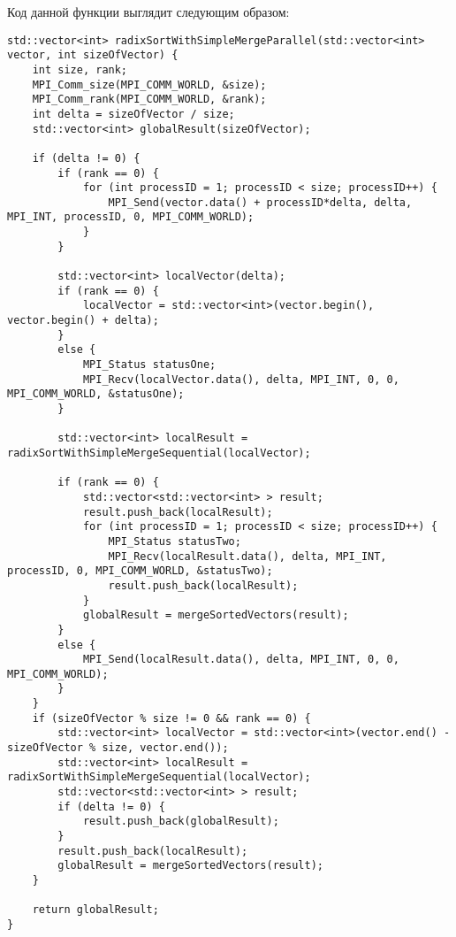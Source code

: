 \documentclass[a4paper, 14pt]{article}
\theoremstyle{plain}
\begin{document}
Код данной функции выглядит следующим образом:
\vspace{-1.9em}
\begin{verbatim}
std::vector<int> radixSortWithSimpleMergeParallel(std::vector<int> vector, int sizeOfVector) {
	int size, rank;
	MPI_Comm_size(MPI_COMM_WORLD, &size);
	MPI_Comm_rank(MPI_COMM_WORLD, &rank);
	int delta = sizeOfVector / size;
	std::vector<int> globalResult(sizeOfVector);
	
	if (delta != 0) {
		if (rank == 0) {
			for (int processID = 1; processID < size; processID++) {
				MPI_Send(vector.data() + processID*delta, delta, MPI_INT, processID, 0, MPI_COMM_WORLD);
			}
		}
		
		std::vector<int> localVector(delta);
		if (rank == 0) {
			localVector = std::vector<int>(vector.begin(), vector.begin() + delta);
		}
		else {
			MPI_Status statusOne;
			MPI_Recv(localVector.data(), delta, MPI_INT, 0, 0, MPI_COMM_WORLD, &statusOne);
		}
		
		std::vector<int> localResult = radixSortWithSimpleMergeSequential(localVector);
		
		if (rank == 0) {
			std::vector<std::vector<int> > result;
			result.push_back(localResult);
			for (int processID = 1; processID < size; processID++) {
				MPI_Status statusTwo;
				MPI_Recv(localResult.data(), delta, MPI_INT, processID, 0, MPI_COMM_WORLD, &statusTwo);
				result.push_back(localResult);
			}
			globalResult = mergeSortedVectors(result);
		}
		else {
			MPI_Send(localResult.data(), delta, MPI_INT, 0, 0, MPI_COMM_WORLD);
		}
	}
	if (sizeOfVector % size != 0 && rank == 0) {
		std::vector<int> localVector = std::vector<int>(vector.end() - sizeOfVector % size, vector.end());
		std::vector<int> localResult = radixSortWithSimpleMergeSequential(localVector);
		std::vector<std::vector<int> > result;
		if (delta != 0) {
			result.push_back(globalResult);
		}
		result.push_back(localResult);
		globalResult = mergeSortedVectors(result);
	}
	
	return globalResult;
}
\end{verbatim}
\end{document}
